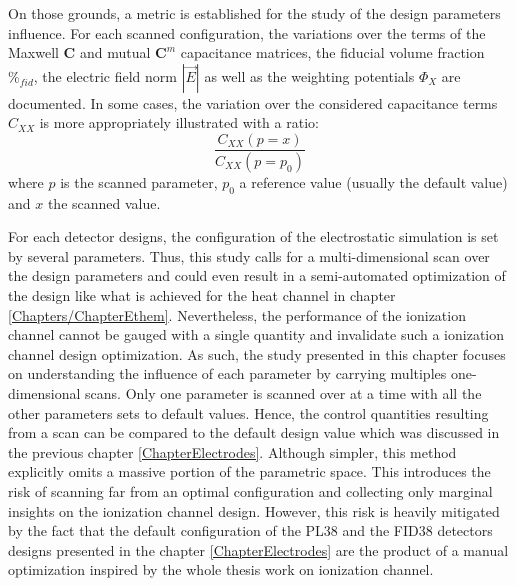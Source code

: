 On those grounds, a metric is established for the study of the design parameters influence. For each scanned configuration, the variations over the terms of the Maxwell $\bm{C}$ and mutual $\bm{C}^m$ capacitance matrices, the fiducial volume fraction $\%_{fid}$, the electric field norm $|\vec{E}|$ as well as the weighting potentials $\Phi_X$ are documented. In some cases, the variation over the considered capacitance terms $C_{XX}$ is more appropriately illustrated with a ratio:
\begin{equation}
\frac{C_{XX}\left(p=x\right)}{C_{XX}\left(p=p_0\right)}
\end{equation}
where $p$ is the scanned parameter, $p_0$ a reference value (usually the default value) and $x$ the scanned value. 

For each detector designs, the configuration of the electrostatic simulation is set by several parameters. Thus, this study calls for a multi-dimensional scan over the design parameters and could even result in a semi-automated optimization of the design like what is achieved for the heat channel in chapter \ref{Chapters/ChapterEthem}. Nevertheless, the performance of the ionization channel cannot be gauged with a single quantity and invalidate such a ionization channel design optimization. As such, the study presented in this chapter focuses on understanding the influence of each parameter by carrying multiples one-dimensional scans. Only one parameter is scanned over at a time with all the other parameters sets to default values. Hence, the control quantities resulting from a scan can be compared to the default design value which was discussed in the previous chapter \ref{ChapterElectrodes}.
Although simpler, this method explicitly omits a massive portion of the parametric space. This introduces the risk of scanning far from an optimal configuration and collecting only marginal insights on the ionization channel design. However, this risk is heavily mitigated by the fact that the default configuration of the PL38 and the FID38 detectors designs presented in the chapter \ref{ChapterElectrodes} are the product of a manual optimization inspired by the whole thesis work on ionization channel.


